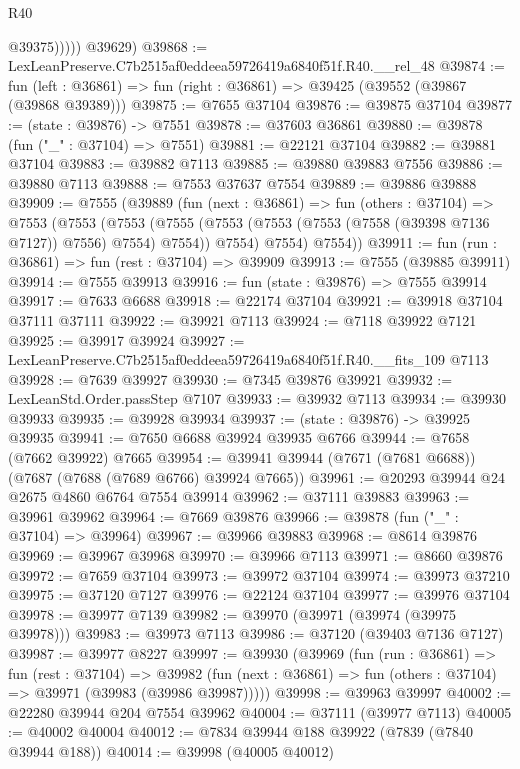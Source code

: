 \begin{lexlean}{R40}
\begin{coremodule}
                @39375)))))
      @39629)
@39868 := LexLeanPreserve.C7b2515af0eddeea59726419a6840f51f.R40.__rel_48
@39874 := fun (left : @36861) => fun (right : @36861) => @39425 (@39552 (@39867 (@39868 @39389)))
@39875 := @7655 @37104
@39876 := @39875 @37104
@39877 := (state : @39876) -> @7551
@39878 := @37603 @36861
@39880 := @39878 (fun ("_" : @37104) => @7551)
@39881 := @22121 @37104
@39882 := @39881 @37104
@39883 := @39882 @7113
@39885 := @39880 @39883 @7556
@39886 := @39880 @7113
@39888 := @7553 @37637 @7554
@39889 := @39886 @39888
@39909 := @7555
    (@39889
      (fun (next : @36861) =>
      fun (others : @37104) =>
      @7553
        (@7553
          (@7553
            (@7555 (@7553 (@7553 (@7553 (@7558 (@39398 @7136 @7127)) @7556) @7554) @7554))
            @7554)
          @7554)
        @7554))
@39911 := fun (run : @36861) => fun (rest : @37104) => @39909
@39913 := @7555 (@39885 @39911)
@39914 := @7555 @39913
@39916 := fun (state : @39876) => @7555 @39914
@39917 := @7633 @6688
@39918 := @22174 @37104
@39921 := @39918 @37104 @37111 @37111
@39922 := @39921 @7113
@39924 := @7118 @39922 @7121
@39925 := @39917 @39924
@39927 := LexLeanPreserve.C7b2515af0eddeea59726419a6840f51f.R40.__fits_109 @7113
@39928 := @7639 @39927
@39930 := @7345 @39876 @39921
@39932 := LexLeanStd.Order.passStep @7107
@39933 := @39932 @7113
@39934 := @39930 @39933
@39935 := @39928 @39934
@39937 := (state : @39876) -> @39925 @39935
@39941 := @7650 @6688 @39924 @39935 @6766
@39944 := @7658 (@7662 @39922) @7665
@39954 := @39941 @39944 (@7671 (@7681 @6688)) (@7687 (@7688 (@7689 @6766) @39924 @7665))
@39961 := @20293 @39944 @24 @2675 @4860 @6764 @7554 @39914
@39962 := @37111 @39883
@39963 := @39961 @39962
@39964 := @7669 @39876
@39966 := @39878 (fun ("_" : @37104) => @39964)
@39967 := @39966 @39883
@39968 := @8614 @39876
@39969 := @39967 @39968
@39970 := @39966 @7113
@39971 := @8660 @39876
@39972 := @7659 @37104
@39973 := @39972 @37104
@39974 := @39973 @37210
@39975 := @37120 @7127
@39976 := @22124 @37104
@39977 := @39976 @37104
@39978 := @39977 @7139
@39982 := @39970 (@39971 (@39974 (@39975 @39978)))
@39983 := @39973 @7113
@39986 := @37120 (@39403 @7136 @7127)
@39987 := @39977 @8227
@39997 := @39930
    (@39969
      (fun (run : @36861) =>
      fun (rest : @37104) =>
      @39982 (fun (next : @36861) => fun (others : @37104) => @39971 (@39983 (@39986 @39987)))))
@39998 := @39963 @39997
@40002 := @22280 @39944 @204 @7554 @39962
@40004 := @37111 (@39977 @7113)
@40005 := @40002 @40004
@40012 := @7834 @39944 @188 @39922 (@7839 (@7840 @39944 @188))
@40014 := @39998 (@40005 @40012)

\end{coremodule}
\end{lexlean}
